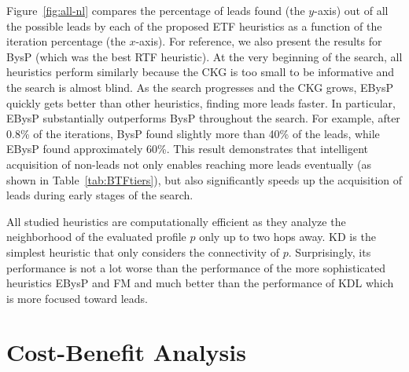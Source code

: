 \documentclass[prodmode,acmtecs]{acmsmall} %
\newcommand{\note}[2]{\textbf{\textsc{#1} says: \textit{#2}}}
\newcommand{\islead}[1]{{\em IsLead(#1)}}
\begin{document}


Figure~\ref{fig:all-nl} compares the percentage of leads found (the $y$-axis) out of all the possible leads by each of the proposed ETF heuristics as a function of the iteration percentage (the $x$-axis).
 For reference, we also present the results for BysP (which was the best RTF heuristic).
At the very beginning of the search, all heuristics perform similarly because the CKG
is too small to be informative and the search is almost blind. As the search
progresses and the CKG grows, EBysP quickly gets better than other  heuristics,
finding more leads faster. In particular, EBysP substantially outperforms BysP throughout the search. 
For example, after  0.8\% of the iterations, BysP found slightly more than 40\% of the leads, while EBysP
found approximately 60\%. This result demonstrates that intelligent acquisition
of non-leads not only enables reaching more leads eventually (as shown in
Table~\ref{tab:BTFtiers}), but also significantly speeds up the acquisition of
leads during  early stages of the search.


All studied heuristics are computationally efficient as they analyze the
neighborhood of the evaluated profile $p$ only up to two hops away. KD is the
simplest heuristic that only considers the connectivity of $p$. Surprisingly,
its performance is not a lot worse than the performance of the more sophisticated
heuristics EBysP and FM and much better than the performance of KDL which is
more focused toward leads.




\section{Cost-Benefit Analysis}
\label{sec:costbenefit}
\end{document}
